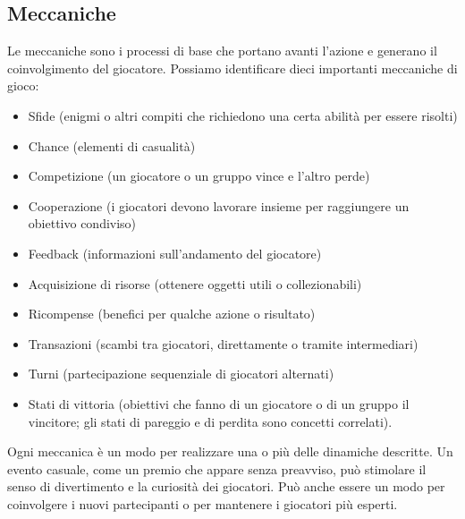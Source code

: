 \begin{itemize}
  \subsection{Meccaniche}
  Le meccaniche sono i processi di base che portano avanti l'azione e generano il coinvolgimento del giocatore. Possiamo identificare dieci importanti meccaniche di gioco:
  \begin{itemize}
\item Sfide (enigmi o altri compiti che richiedono una certa abilità per essere risolti)
\item Chance (elementi di casualità)
\item Competizione (un giocatore o un gruppo vince e l'altro perde)
\item Cooperazione (i giocatori devono lavorare insieme per raggiungere un obiettivo condiviso)
\item Feedback (informazioni sull'andamento del giocatore)
\item Acquisizione di risorse (ottenere oggetti utili o collezionabili)
\item Ricompense (benefici per qualche azione o risultato)
\item Transazioni (scambi tra giocatori, direttamente o tramite intermediari)
\item Turni (partecipazione sequenziale di giocatori alternati)
\item Stati di vittoria (obiettivi che fanno di un giocatore o di un gruppo il vincitore; gli stati di pareggio e di
  perdita sono concetti correlati).
\end{itemize}
Ogni meccanica è un modo per realizzare una o più delle dinamiche descritte. Un evento casuale, come un premio che appare senza preavviso, può stimolare il senso di divertimento e la curiosità dei giocatori. Può anche essere un modo per coinvolgere i nuovi partecipanti o per mantenere i giocatori più esperti.

\end{itemize}
